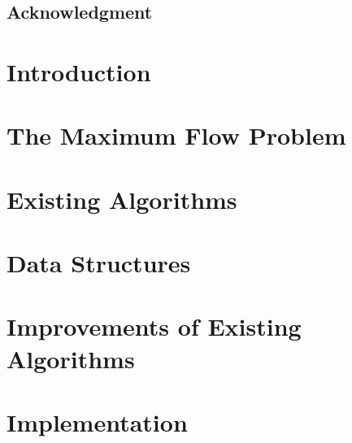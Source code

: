 \documentclass[a4paper,11pt, openright]{book}
\theoremstyle{definition}
\begin{document}
\pagestyle{empty} %



\restoregeometry
\cleardoublepage
\section*{Acknowledgment}

\cleardoublepage
\tableofcontents %
\cleardoublepage %

\pagestyle{plain} %




\chapter*{Introduction}


\chapter{The Maximum Flow Problem}\label{flow_problem}


\chapter{Existing Algorithms}\label{algos}


\chapter{Data Structures}\label{data_struct}


\chapter{Improvements of Existing Algorithms}\label{improvements}


\chapter{Implementation}\label{implementation}

\end{document}
